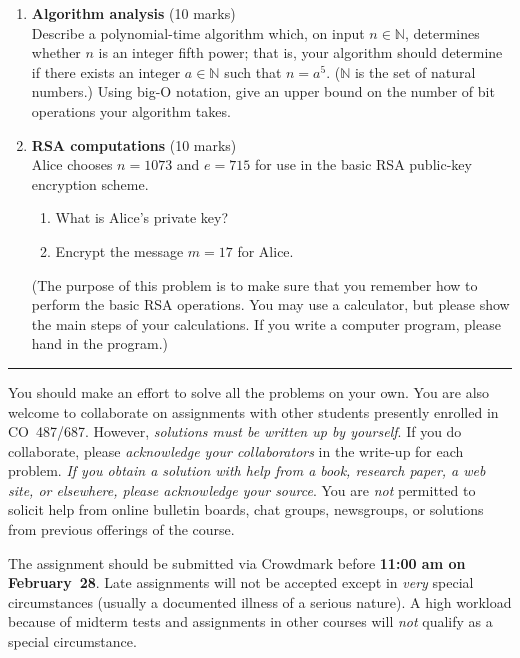 \documentclass[11pt]{article}
\newcommand{\NN}{{\mathbb N}}
\begin{document}
\begin{enumerate}
\newpage
\item {\bf Algorithm analysis} (10 marks) \\
Describe a polynomial-time algorithm which, on input $n \in \NN$,
determines whether $n$ is an integer fifth power; that is, your algorithm
should determine if there exists an integer $a \in \NN$ such that $n
= a^5$.  ($\NN$ is the set of natural numbers.) Using big-O notation,
give an upper bound on the number of bit operations your algorithm takes.

\item {\bf RSA computations} (10 marks)\\
Alice chooses $n=1073$ and $e=715$ for use in the basic RSA public-key
encryption scheme.
\begin{enumerate}
\item What is Alice's private key?
\item Encrypt the message $m=17$ for Alice.
\end{enumerate}
(The purpose of this problem is to make sure that you remember how to
perform the basic RSA operations. You may use a calculator, but please
show the main steps of your calculations. If you write a computer program,
please hand in the program.)

\end{enumerate}


\hfill\hrule

\vspace*{2mm}
\noindent
You should make an effort to solve all the problems on your own.
You are also welcome to collaborate on assignments with other students
presently enrolled in CO~487/687. However, \emph{solutions must be
written up by yourself}. If you do collaborate, please \emph{acknowledge
your collaborators} in the write-up for each problem. \emph{If you
obtain a solution with help from a book, research paper, a web site,
or elsewhere, please acknowledge your source}. You are \emph{not}
permitted to solicit help from online bulletin boards, chat groups,
newsgroups, or solutions from previous offerings of the course.

\vspace*{2mm}
\noindent
The assignment should be submitted via Crowdmark before {\bf 11:00 am
on February~28}. Late assignments will not be accepted except in
\emph{very} special circumstances (usually a documented illness of
a serious nature). A high workload because of midterm tests and assignments
in other courses will \emph{not} qualify as a special circumstance.
\end{document}
